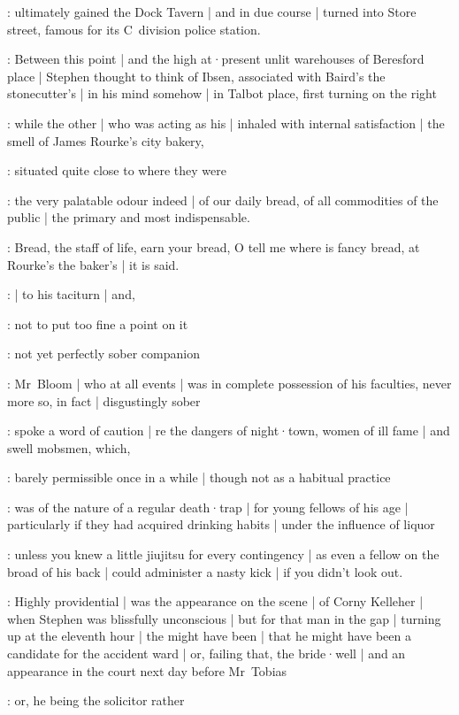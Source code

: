 :
ultimately gained the Dock Tavern |
and in due course |
turned into Store street,
famous for its C~division police station.

:
Between this point |
and the high at·present unlit warehouses of Beresford place |
Stephen thought to think of Ibsen,
associated with Baird's the stonecutter's |
in his mind somehow |
in Talbot place,
first turning on the right

:
while the other |
who was acting as his  |
inhaled with internal satisfaction |
the smell of James Rourke's city bakery,

:
situated quite close to where they were

:
the very palatable odour indeed |
of our daily bread,
of all commodities of the public |
the primary and most indispensable.

:
Bread,
the staff of life,
earn your bread,
O tell me where is fancy bread,
at Rourke's the baker's |
it is said.

:
 |
to his taciturn |
and,%

:
not to put too fine a point on it

:
not yet perfectly sober companion

:
Mr~Bloom |
who at all events |
was in complete possession of his faculties,
never more so,
in fact |
disgustingly sober

:
spoke a word of caution |
re the dangers of night·town,
women of ill fame |
and swell mobsmen,
which,

:
barely permissible once in a while |
though not as a habitual practice

:
was of the nature of a regular death·trap |
for young fellows of his age |
particularly if they had acquired drinking habits |
under the influence of liquor

:
unless you knew a little jiujitsu for every contingency |
as even a fellow on the broad of his back |
could administer a nasty kick |
if you didn't look out.

:
Highly providential |
was the appearance on the scene |
of Corny Kelleher |
when Stephen was blissfully unconscious |
but for that man in the gap |
turning up at the eleventh hour |
the  might have been |
that he might have been a candidate for the accident ward |
or,
failing that,
the bride·well |
and an appearance in the court next day before Mr~Tobias

:
or,
he being the solicitor rather

